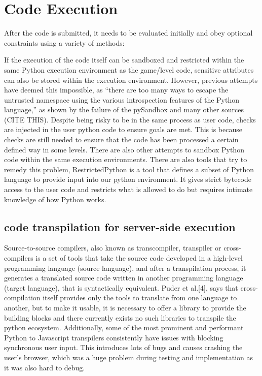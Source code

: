 \section{Code Execution}
After the code is submitted, it needs to be evaluated initially and obey optional constraints using a variety of methods:

If the execution of the code itself can be sandboxed and restricted within the same Python execution environment as the game/level code, sensitive attributes can also be stored within the execution environment. However, previous attempts have deemed this impossible, as “there are too many ways to escape the untrusted namespace using the various introspection features of the Python language,” as shown by the failure of the pySandbox and many other sources (CITE THIS). Despite being risky to be in the same process as user code, checks are injected in the user python code to ensure goals are met. This is because checks are still needed to ensure that the code has been processed a certain defined way in some levels. There are also other attempts to sandbox Python code within the same execution environments. There are also tools that try to remedy this problem, RestrictedPython is a tool that defines a subset of Python language to provide input into our python environment. It gives strict bytecode access to the user code and restricts what is allowed to do but requires intimate knowledge of how Python works. 

\subsection{code transpilation for server-side execution}
Source-to-source compilers, also known as transcompiler, transpiler or cross-compilers is a set of tools that take the source code developed in a high-level programming language (source language), and after a transpilation process, it generates a translated source code written in another programming language (target language), that is syntactically equivalent. Puder et al.[4], says that cross-compilation itself provides only the tools to translate from one language to another, but to make it usable, it is necessary to offer a library to provide the building blocks and there currently exists no such libraries to transpile the python ecosystem. Additionally, some of the most prominent and performant Python to Javascript transpilers consistently have issues with blocking synchronous user input. This introduces lots of bugs and causes crashing the user's browser, which was a huge problem during testing and implementation as it was also hard to debug.

